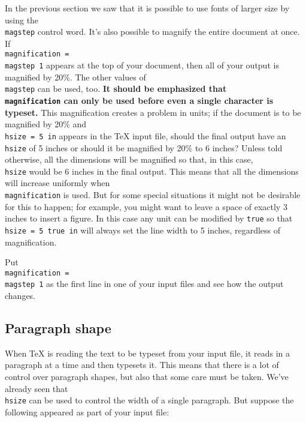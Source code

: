 In the previous section we saw that it is possible to use fonts 
of larger size by using the {\tt \\magstep} control word.  It's 
also possible to magnify the entire document at once. If {\tt 
\\magnification = \\magstep 1} appears at the top of your document, 
then all of your output is magnified by 20\%\null.  The other 
values of {\tt \\magstep} can be used, too. {\bf It should be 
emphasized that {\tt \\magnification} can only be used before 
even a single character is typeset.}  This magnification creates 
a problem in units; if the document is to be magnified by 20\% 
and {\tt \\hsize = 5 in} appears in the \TeX{} input file, should 
the final output have an {\tt \\hsize} of 5 inches or should it 
be magnified by 20\% to 6 inches? Unless told otherwise, all the 
dimensions will be magnified so that, in this case, {\tt \\hsize} 
would be 6 inches in the final output.  This means that all the 
dimensions will increase uniformly when {\tt \\magnification} is 
used.  But for some special situations it might not be desirable 
for this to happen; for example, you might want to leave a space 
of exactly 3 inches to insert a figure.  In this case any unit 
can be modified by {\tt true} so that {\tt \\hsize = 5 true in} 
will always set the line width to 5 inches, regardless of 
magnification.   
 
\exercise Put {\tt \\magnification = \\magstep 1} as the first 
line in one of your input files and see how the output changes. 
 
\subsection{Paragraph shape} 
 
When \TeX{} is reading the text to be typeset from your input 
file, it reads in a paragraph at a time and then typesets it. 
This means that there is a lot of control over paragraph shapes, 
but also that some care must be taken.  We've already seen that 
{\tt \\hsize} can be used to control the width of a single 
paragraph.  But suppose the following appeared as part of your 
input file: 
 
